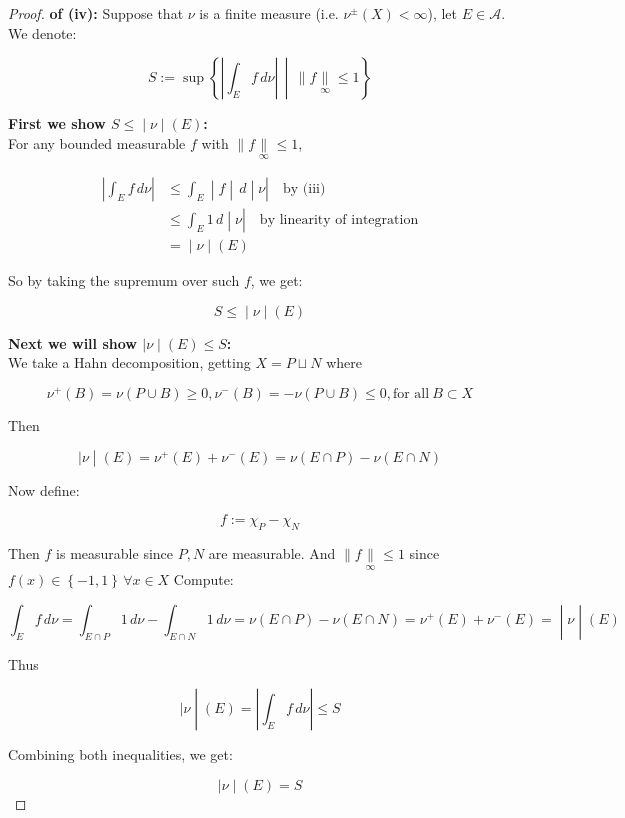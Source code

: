 \documentclass{qlnotes-export}
\begin{document}
\begin{proof}

\textbf{of (iv):} Suppose that \(\nu\) is a finite measure (i.e. \(\nu^{\pm}(X) < \infty\)), let \(E \in \mathcal{A}\).\\
We denote:

\[S := \sup\left\{ \left| {\int_{E}f\, d\nu} \right|\, \middle| \, \parallel f\underset{\infty}{\parallel} \leq 1 \right\}\]

\textbf{First we show \(\left. S \leq \middle| \nu \middle| (E) \right.\):}\\
For any bounded measurable \(f\) with \(\parallel f\underset{\infty}{\parallel} \leq 1\),

\[\begin{matrix}
\left| {\int_{E}f\, d\nu} \right| & {\left. \leq \int_{E} \middle| f \middle| \, d \middle| \nu \right|\quad\text{by (iii)}} \\
 & {\left. \leq \int_{E}1\, d \middle| \nu \right|\quad\text{by linearity of integration}} \\
 & \left. = \middle| \nu \middle| (E) \right.
\end{matrix}\]

So by taking the supremum over such \(f\), we get:

\[\left. S \leq \middle| \nu \middle| (E) \right.\]

\textbf{Next we will show \(\left. |\nu \middle| (E) \leq S \right.\):}\\
We take a Hahn decomposition, getting \(X = P \sqcup N\) where

\[\nu^{+}(B) = \nu(P \cup B) \geq 0,\nu^{-}(B) = - \nu(P \cup B) \leq 0,\text{for all}\ B \subset X\]

Then

\[\left. |\nu \middle| (E) = \nu^{+}(E) + \nu^{-}(E) = \nu(E \cap P) - \nu(E \cap N) \right.\]

Now define:

\[f := \chi_{P} - \chi_{N}\]

Then \(f\) is measurable since \(P,N\) are measurable. And \(\parallel f\underset{\infty}{\parallel} \leq 1\) since \(f(x) \in \left\{ {- 1,1} \right\}\,\forall x \in X\) Compute:

\[\left. \int_{E}f\, d\nu = \int_{E \cap P}1\, d\nu - \int_{E \cap N}1\, d\nu = \nu(E \cap P) - \nu(E \cap N) = \nu^{+}(E) + \nu^{-}(E) = \middle| \nu \middle| (E) \right.\]

Thus

\[\left. |\nu \middle| (E) = \left| {\int_{E}f\, d\nu} \right| \leq S \right.\]

Combining both inequalities, we get:

\[\left. |\nu \middle| (E) = S \right.\]

\end{proof}
\end{document}
